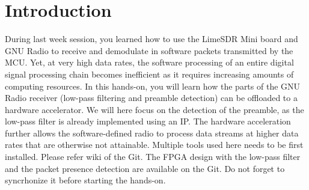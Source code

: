 \section*{Introduction}

During last week session, you learned how to use the LimeSDR Mini board and GNU Radio to receive and demodulate in software packets transmitted by the MCU. Yet, at very high data rates, the software processing of an entire digital signal processing chain becomes inefficient as it requires increasing amounts of computing resources. In this hands-on, you will learn how the parts of the GNU Radio receiver (low-pass filtering and preamble detection) can be offloaded to a hardware accelerator. We will here focus on the detection of the preamble, as the low-pass filter is already implemented using an IP. The hardware acceleration further allows the software-defined radio to process data streams at higher data rates that are otherwise not attainable. Multiple tools used here needs to be first installed. Please refer wiki of the Git. The FPGA design with the low-pass filter and the packet presence detection are available on the Git. Do not forget to syncrhonize it before starting the hands-on.
